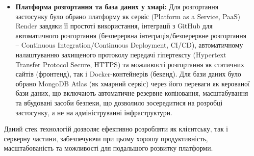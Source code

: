 \begin{itemize}
    \item \textbf{Платформа розгортання та база даних у хмарі:} Для розгортання застосунку було обрано платформу як сервіс (Platform as a Service, PaaS) Render \cite{renderpaas} завдяки її простоті використання, інтеграції з GitHub для автоматичного розгортання (безперервна інтеграція/безперервне розгортання – Continuous Integration/Continuous Deployment, CI/CD), автоматичному налаштуванню захищеного протоколу передачі гіпертексту (Hypertext Transfer Protocol Secure, HTTPS) та можливості розгортання як статичних сайтів (фронтенд), так і Docker-контейнерів (бекенд). Для бази даних було обрано MongoDB Atlas \cite{mongodb} (як хмарний сервіс) через його переваги як керованої бази даних, що включають автоматичне резервне копіювання, масштабування та вбудовані засоби безпеки, що дозволило зосередитися на розробці застосунку, а не на адмініструванні інфраструктури.
\end{itemize}
Даний стек технологій дозволяє ефективно розробляти як клієнтську, так і серверну частини, забезпечуючи при цьому хорошу продуктивність, масштабованість та можливості для подальшого розвитку платформи. 